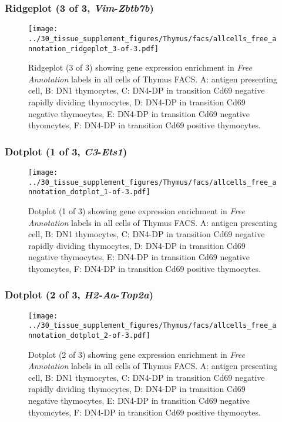 \clearpage

\subsubsection{Ridgeplot (3 of 3, \emph{Vim}-\emph{Zbtb7b})}
\begin{figure}[h]
\centering
\texttt{[image: ../30\_tissue\_supplement\_figures/Thymus/facs/allcells\_free\_annotation\_ridgeplot\_3-of-3.pdf]}

\caption{ Ridgeplot (3 of 3)  showing gene expression enrichment in \emph{Free Annotation} labels in all cells of Thymus FACS. A: antigen presenting cell, B: DN1 thymocytes, C: DN4-DP in transition Cd69 negative rapidly dividing thymocytes, D: DN4-DP in transition Cd69 negative thymocytes, E: DN4-DP in transition Cd69 negative thyomcytes, F: DN4-DP in transition Cd69 positive thymocytes.}
\end{figure}


\clearpage

\subsubsection{Dotplot (1 of 3, \emph{C3}-\emph{Ets1})}
\begin{figure}[h]
\centering
\texttt{[image: ../30\_tissue\_supplement\_figures/Thymus/facs/allcells\_free\_annotation\_dotplot\_1-of-3.pdf]}

\caption{ Dotplot (1 of 3)  showing gene expression enrichment in \emph{Free Annotation} labels in all cells of Thymus FACS. A: antigen presenting cell, B: DN1 thymocytes, C: DN4-DP in transition Cd69 negative rapidly dividing thymocytes, D: DN4-DP in transition Cd69 negative thymocytes, E: DN4-DP in transition Cd69 negative thyomcytes, F: DN4-DP in transition Cd69 positive thymocytes.}
\end{figure}


\clearpage

\subsubsection{Dotplot (2 of 3, \emph{H2-Aa}-\emph{Top2a})}
\begin{figure}[h]
\centering
\texttt{[image: ../30\_tissue\_supplement\_figures/Thymus/facs/allcells\_free\_annotation\_dotplot\_2-of-3.pdf]}

\caption{ Dotplot (2 of 3)  showing gene expression enrichment in \emph{Free Annotation} labels in all cells of Thymus FACS. A: antigen presenting cell, B: DN1 thymocytes, C: DN4-DP in transition Cd69 negative rapidly dividing thymocytes, D: DN4-DP in transition Cd69 negative thymocytes, E: DN4-DP in transition Cd69 negative thyomcytes, F: DN4-DP in transition Cd69 positive thymocytes.}
\end{figure}


